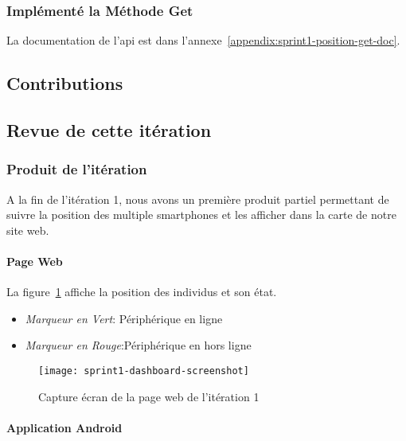 \subsubsection{Implémenté la Méthode Get}

La documentation de l'api est dans l'annexe~\ref{appendix:sprint1-position-get-doc}.


\subsection{Contributions}


\subsection{Revue de cette itération}
\subsubsection{Produit de l'itération}

A la fin de l'itération 1, nous avons un première produit partiel permettant de
suivre la position des multiple smartphones et les afficher dans la carte de
notre site web.

\paragraph{Page Web }

La figure~\ref{fig:sprint1-dashboard-screenshot} affiche la position des
individus et son état.
\begin{itemize}
 \item \textit{Marqueur en Vert}: Périphérique en ligne
 \item \textit{Marqueur en Rouge}:Périphérique en hors ligne
\end{itemize}

\begin{figure}[htbp]
  \centering
  \texttt{[image: sprint1-dashboard-screenshot]}
  \caption{Capture écran de la page web de l'itération 1}
  \label{fig:sprint1-dashboard-screenshot}
\end{figure}

\paragraph{Application Android}

